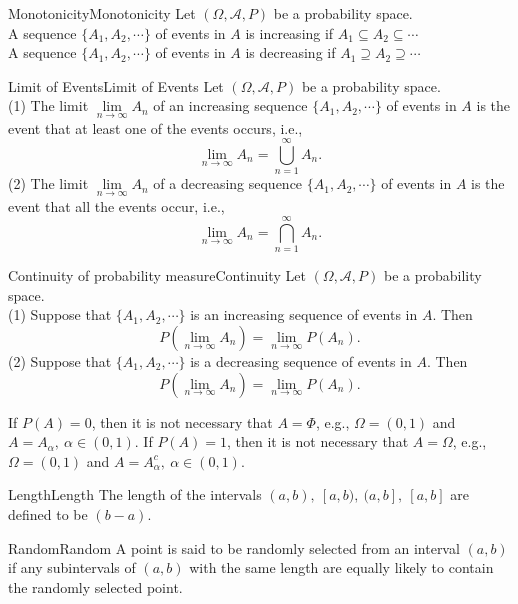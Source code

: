 \documentclass{elegantbook}
\newcommand\dis{\displaystyle}
\newcommand\limn{\dis\lim\limits_{n\to\infty}}
\newcommand\ma{\mathcal{A}}
\begin{document}
\begin{definition}{Monotonicity}{Monotonicity}
Let $(\Omega,\ma, P)$ be a probability space.\\
A sequence $\{A_1,A_2,\cdots\}$ of events in $A$ is increasing if $A_1\subseteq A_2\subseteq\cdots$\\
A sequence $\{A_1,A_2,\cdots\}$ of events in $A$ is decreasing if $A_1\supseteq A_2\supseteq\cdots$

\end{definition}

\begin{definition}{Limit of Events}{Limit of Events}
Let $(\Omega,\ma, P)$ be a probability space.\\
(1) The limit $\limn A_n$ of an increasing sequence $\{A_1,A_2,\cdots\}$ of events in $A$ is the event that at least one of the events occurs, i.e., $$\limn A_n=\bigcup_{n=1}^\infty A_n.$$
(2) The limit $\limn A_n$ of a decreasing sequence $\{A_1,A_2,\cdots\}$ of events in $A$ is the event that all the events occur, i.e., $$\limn A_n=\bigcap_{n=1}^\infty A_n.$$

\end{definition}

\begin{theorem}{Continuity of probability measure}{Continuity}
Let $(\Omega,\ma, P)$ be a probability space.\\
(1) Suppose that $\{A_1,A_2,\cdots\}$ is an increasing sequence of events in $A$. Then $$P\left(\limn A_n\right)=\limn P(A_n).$$
(2) Suppose that $\{A_1,A_2,\cdots\}$ is a decreasing sequence of events in $A$. Then $$P\left(\limn A_n\right)=\limn P(A_n).$$
\end{theorem}

\begin{remark}
If $P(A)=0$, then it is not necessary that $A=\Phi$, e.g., $\Omega=(0,1)$ and $A=A_\alpha,\ \alpha\in(0,1)$.
If $P(A)=1$, then it is not necessary that $A=\Omega$, e.g., $\Omega=(0,1)$ and $A=A_\alpha^c,\ \alpha\in(0,1)$.

\end{remark}

\begin{definition}{Length}{Length}
The length of the intervals $(a,b),\ [a,b),\ (a,b],\ [a,b]$ are defined to be $(b-a)$.
\end{definition}

\begin{definition}{Random}{Random}
A point is said to be randomly selected from an interval $(a,b)$ if any subintervals of $(a,b)$ with the same length are equally likely to contain the randomly selected point.
\end{definition}
\end{document}
